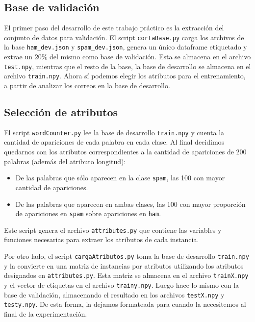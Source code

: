 \documentclass[10pt, a4paper]{article}
\begin{document}
\subsection{Base de validación}

El primer paso del desarrollo de este trabajo práctico es la extracción del conjunto de datos para validación. El script \texttt{cortaBase.py} carga los archivos de la base \texttt{ham\_dev.json} y \texttt{spam\_dev.json}, genera un único dataframe etiquetado y extrae un $20\%$ del mismo como base de validación. Esta se almacena en el archivo \texttt{test.npy}, mientras que el resto de la base, la base de desarrollo se almacena en el archivo \texttt{train.npy}. Ahora sí podemos elegir los atributos para el entrenamiento, a partir de analizar los correos en la base de desarrollo.

\subsection{Selección de atributos}

El script \texttt{wordCounter.py} lee la base de desarrollo \texttt{train.npy} y cuenta la cantidad de apariciones de cada palabra en cada clase. Al final decidimos quedarnos con los atributos correspondientes a la cantidad de apariciones de 200 palabras (además del atributo longitud):

\begin{itemize}
\item De las palabras que sólo aparecen en la clase \texttt{spam}, las 100 con mayor cantidad de apariciones.
\item De las palabras que aparecen en ambas clases, las 100 con mayor proporción de apariciones en \texttt{spam} sobre apariciones en \texttt{ham}.
\end{itemize}

Este script genera el archivo \texttt{attributes.py} que contiene las variables y funciones necesarias para extraer los atributos de cada instancia.

Por otro lado, el script \texttt{cargaAtributos.py} toma la base de desarrollo \texttt{train.npy} y la convierte en una matriz de instancias por atributos utilizando los atributos designados en \texttt{attributes.py}. Esta matriz se almacena en el archivo \texttt{trainX.npy} y el vector de etiquetas en el archivo \texttt{trainy.npy}. Luego hace lo mismo con la base de validación, almacenando el resultado en los archivos \texttt{testX.npy} y \texttt{testy.npy}. De esta forma, la dejamos formateada para cuando la necesitemos al final de la experimentación.
\end{document}
